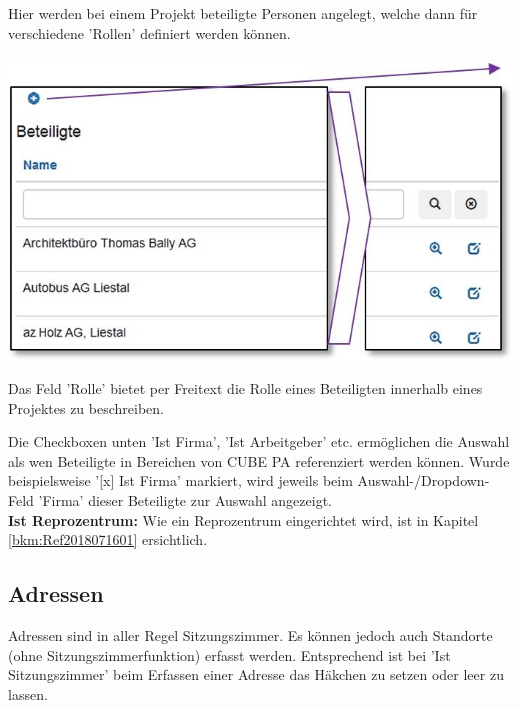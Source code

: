 Hier werden bei einem Projekt beteiligte Personen angelegt, welche dann für verschiedene 'Rollen' definiert werden können.

\begin{center}
\hspace{-15pt}   
\includegraphics[width=.9\linewidth]{../chapters/13_Konfigurationen/pictures/13-4_Beteiligte.jpg}
\end{center}

Das Feld 'Rolle' bietet per Freitext die Rolle eines Beteiligten innerhalb eines Projektes zu beschreiben. 

\vspace{\baselineskip}

Die Checkboxen unten 'Ist Firma', 'Ist Arbeitgeber' etc. ermöglichen die Auswahl als wen Beteiligte in Bereichen von CUBE PA referenziert werden können. Wurde beispielsweise '[x] Ist Firma' markiert, wird jeweils beim Auswahl-/Dropdown-Feld 'Firma' dieser Beteiligte zur Auswahl angezeigt.\\

\textbf{Ist Reprozentrum:} Wie ein Reprozentrum eingerichtet wird, ist in Kapitel \ref{bkm:Ref2018071601} ersichtlich.

\vspace{\baselineskip}
\vspace{\baselineskip}
\vspace{\baselineskip}


\subsection{Adressen}

Adressen sind in aller Regel Sitzungszimmer. Es können jedoch auch Standorte (ohne Sitzungszimmerfunktion) erfasst werden. Entsprechend ist bei 'Ist Sitzungszimmer' beim Erfassen einer Adresse das Häkchen zu setzen oder leer zu lassen.

